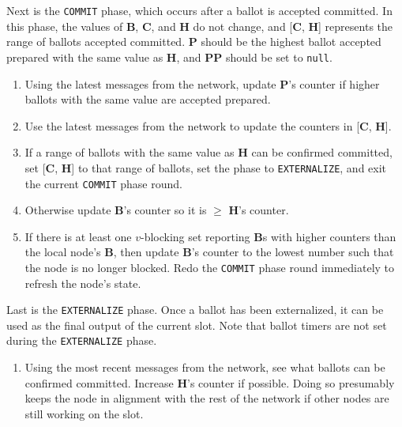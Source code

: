 Next is the {\tt COMMIT} phase, which occurs after a ballot is accepted committed. In this phase, the values of \textbf{B}, \textbf{C}, and \textbf{H} do not change, and [\textbf{C}, \textbf{H}] represents the range of ballots accepted committed. \textbf{P} should be the highest ballot accepted prepared with the same value as \textbf{H}, and \textbf{PP} should be set to {\tt null}.

\begin{enumerate}
    \item Using the latest messages from the network, update \textbf{P}'s counter if higher ballots with the same value are accepted prepared.

    \item Use the latest messages from the network to update the counters in [\textbf{C}, \textbf{H}].

    \item If a range of ballots with the same value as \textbf{H} can be confirmed committed, set [\textbf{C}, \textbf{H}] to that range of ballots, set the phase to {\tt EXTERNALIZE}, and exit the current {\tt COMMIT} phase round.

    \item Otherwise update \textbf{B}'s counter so it is $\geq$ \textbf{H}'s counter.

    \item If there is at least one $v$-blocking set reporting \textbf{B}s with higher counters than the local node's \textbf{B}, then update \textbf{B}'s counter to the lowest number such that the node is no longer blocked. Redo the {\tt COMMIT} phase round immediately to refresh the node's state.
\end{enumerate}

Last is the {\tt EXTERNALIZE} phase. Once a ballot has been externalized, it can be used as the final output of the current slot. Note that ballot timers are not set during the {\tt EXTERNALIZE} phase.

\begin{enumerate}
    \item Using the most recent messages from the network, see what ballots can be confirmed committed. Increase \textbf{H}'s counter if possible. Doing so presumably keeps the node in alignment with the rest of the network if other nodes are still working on the slot.
\end{enumerate}



